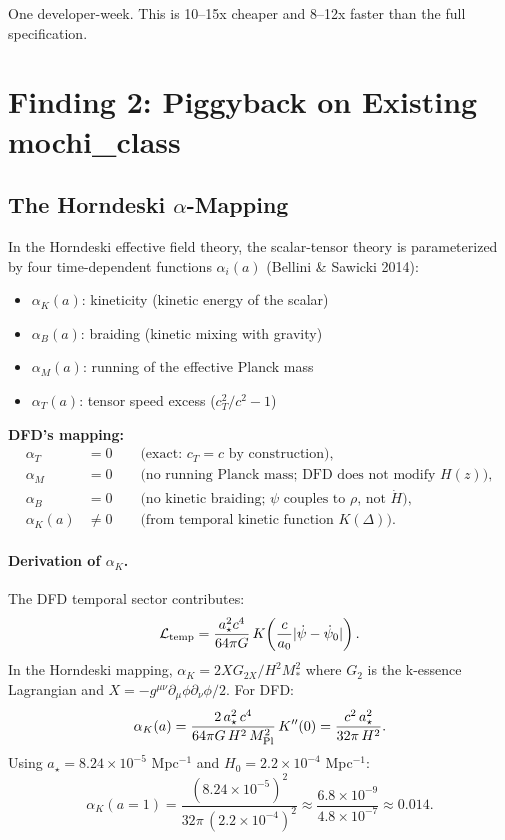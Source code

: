 \documentclass[11pt]{article}
\theoremstyle{definition}
\theoremstyle{remark}
\newcommand{\ee}[1]{\times 10^{#1}}
\newcommand{\astar}{a_\star}
\newcommand{\aM}{a_0}
\begin{document}
One developer-week. This is 10--15x cheaper and 8--12x faster than
the full specification.

\section{Finding 2: Piggyback on Existing mochi\_class}
\label{sec:piggyback}

\subsection{The Horndeski $\alpha$-Mapping}

In the Horndeski effective field theory, the scalar-tensor theory
is parameterized by four time-dependent functions $\alpha_i(a)$
(Bellini \& Sawicki 2014):

\begin{itemize}
\item $\alpha_K(a)$: kineticity (kinetic energy of the scalar)
\item $\alpha_B(a)$: braiding (kinetic mixing with gravity)
\item $\alpha_M(a)$: running of the effective Planck mass
\item $\alpha_T(a)$: tensor speed excess ($c_T^2/c^2 - 1$)
\end{itemize}

\textbf{DFD's mapping:}
\begin{align}
\alpha_T &= 0 \qquad \text{(exact: } c_T = c \text{ by construction)}, \\
\alpha_M &= 0 \qquad \text{(no running Planck mass; DFD does not modify }H(z)\text{)}, \\
\alpha_B &= 0 \qquad \text{(no kinetic braiding; } \psi \text{ couples to } \rho\text{, not } \dot{H}\text{)}, \\
\alpha_K(a) &\neq 0 \qquad \text{(from temporal kinetic function } K(\Delta)\text{)}.
\end{align}

\paragraph{Derivation of $\alpha_K$.}
The DFD temporal sector contributes:
\[
\mathcal{L}_{\rm temp} = \frac{\astar^2 c^4}{64\pi G}\,K\!\left(\frac{c}{\aM}|\dot\psi - \dot\psi_0|\right).
\]
In the Horndeski mapping, $\alpha_K = 2X G_{2X}/H^2 M_*^2$ where
$G_2$ is the k-essence Lagrangian and $X = -g^{\mu\nu}\partial_\mu\phi
\partial_\nu\phi/2$. For DFD:
\begin{equation}
\alpha_K(a) = \frac{2\,\astar^2\,c^4}{64\pi G\,H^2\,M_{\rm Pl}^2}\,K''(0)
= \frac{c^2\,\astar^2}{32\pi\,H^2}.
\label{eq:alphaK}
\end{equation}
Using $\astar = 8.24 \ee{-5}$ Mpc$^{-1}$ and $H_0 = 2.2 \ee{-4}$ Mpc$^{-1}$:
\[
\alpha_K(a=1) = \frac{(8.24\ee{-5})^2}{32\pi\,(2.2\ee{-4})^2}
\approx \frac{6.8\ee{-9}}{4.8\ee{-7}} \approx 0.014.
\]
\end{document}
